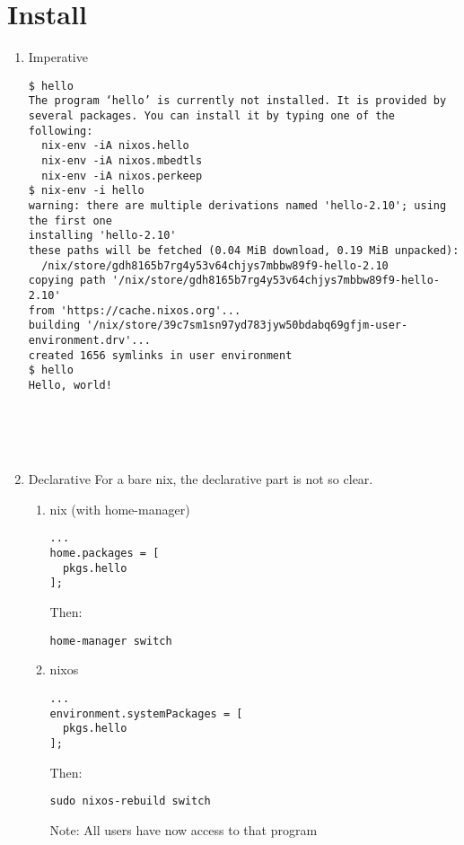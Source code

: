 \documentclass[smaller]{beamer}
\begin{document}
\section{Install}
\label{sec:org100e578}
\begin{enumerate}
\item Imperative
\label{sec:orgf7a4fd2}

\begin{verbatim}
$ hello
The program ‘hello’ is currently not installed. It is provided by
several packages. You can install it by typing one of the following:
  nix-env -iA nixos.hello
  nix-env -iA nixos.mbedtls
  nix-env -iA nixos.perkeep
$ nix-env -i hello
warning: there are multiple derivations named 'hello-2.10'; using the first one
installing 'hello-2.10'
these paths will be fetched (0.04 MiB download, 0.19 MiB unpacked):
  /nix/store/gdh8165b7rg4y53v64chjys7mbbw89f9-hello-2.10
copying path '/nix/store/gdh8165b7rg4y53v64chjys7mbbw89f9-hello-2.10'
from 'https://cache.nixos.org'...
building '/nix/store/39c7sm1sn97yd783jyw50bdabq69gfjm-user-environment.drv'...
created 1656 symlinks in user environment
$ hello
Hello, world!
\end{verbatim}

\hfill\\
\hfill\\
\hfill\\

\item Declarative
\label{sec:org3afb36c}
For a bare nix, the declarative part is not so clear.\\

\begin{enumerate}
\item nix (with home-manager)
\label{sec:orga175ac5}

\begin{verbatim}
...
home.packages = [
  pkgs.hello
];
\end{verbatim}

Then:\\
\begin{verbatim}
home-manager switch
\end{verbatim}

\item nixos
\label{sec:orga3559c9}

\begin{verbatim}
...
environment.systemPackages = [
  pkgs.hello
];
\end{verbatim}

Then:\\
\begin{verbatim}
sudo nixos-rebuild switch
\end{verbatim}

Note: All users have now access to that program\\
\end{enumerate}
\end{enumerate}
\end{document}
